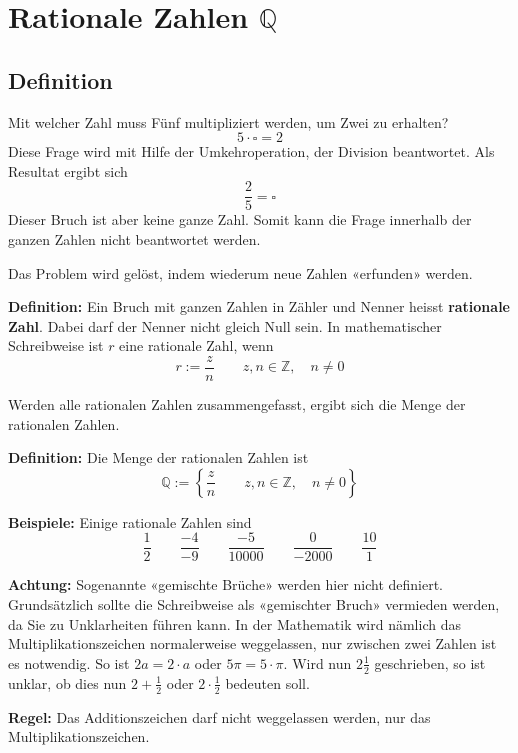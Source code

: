 \newpage
\section{Rationale Zahlen $\mathbb{Q}$}

\subsection{Definition}

Mit welcher Zahl muss Fünf multipliziert werden, um Zwei zu erhalten?
\[
  5\cdot\square = 2
\]
Diese Frage wird mit Hilfe der Umkehroperation, der Division beantwortet. Als Resultat ergibt sich
\[
  \frac{2}{5} = \square
\]
Dieser Bruch ist aber keine ganze Zahl. Somit kann die Frage innerhalb der ganzen Zahlen nicht beantwortet werden.

Das Problem wird gelöst, indem wiederum neue Zahlen «erfunden» werden.

\textbf{Definition:} Ein Bruch mit ganzen Zahlen in Zähler und Nenner heisst \textbf{rationale Zahl}. Dabei darf der Nenner nicht gleich Null sein. In mathematischer Schreibweise ist $r$ eine rationale Zahl, wenn
  \[
    r := \frac{z}{n} \qquad z,n \in \mathbb{Z},\quad n \ne 0
  \]

Werden alle rationalen Zahlen zusammengefasst, ergibt sich die Menge der rationalen Zahlen.

\textbf{Definition:} Die Menge der rationalen Zahlen ist
  \[
    \mathbb{Q} := \left\{ \frac{z}{n} \qquad z,n \in \mathbb{Z}, \quad n \ne 0\right\}
  \]

\begin{example}
  \textbf{Beispiele:} Einige rationale Zahlen sind
  \[
    \frac{1}{2} \qquad \frac{-4}{-9} \qquad \frac{-5}{10000} \qquad \frac{0}{-2000} \qquad \frac{10}{1}
  \]
\end{example}

\begin{note}
  \textbf{Achtung:} Sogenannte «gemischte Brüche» werden hier nicht definiert. Grundsätzlich sollte die Schreibweise als «gemischter Bruch» vermieden werden, da Sie zu Unklarheiten führen kann. In der Mathematik wird nämlich das Multiplikationszeichen normalerweise weggelassen, nur zwischen zwei Zahlen ist es notwendig. So ist $2a = 2\cdot a$ oder $5\pi = 5\cdot\pi$. Wird nun $2\frac{1}{2}$ geschrieben, so ist unklar, ob dies nun $2+\frac{1}{2}$ oder $2\cdot\frac{1}{2}$ bedeuten soll.

  \textbf{Regel:} Das Additionszeichen darf nicht weggelassen werden, nur das Multiplikationszeichen.
\end{note}

